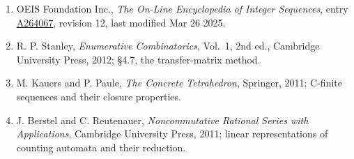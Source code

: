 \documentclass[11pt]{article}
\theoremstyle{definition}
\begin{document}
\begin{enumerate}

\item OEIS Foundation Inc., \emph{The On-Line Encyclopedia of Integer Sequences}, entry \href{https://oeis.org/A264067}{A264067}, revision 12, last modified Mar 26 2025.

\item R. P. Stanley, \emph{Enumerative Combinatorics}, Vol.~1, 2nd ed., Cambridge University Press, 2012; \S4.7, the transfer-matrix method.

\item M. Kauers and P. Paule, \emph{The Concrete Tetrahedron}, Springer, 2011; C-finite sequences and their closure properties.

\item J. Berstel and C. Reutenauer, \emph{Noncommutative Rational Series with Applications}, Cambridge University Press, 2011; linear representations of counting automata and their reduction.

\end{enumerate}
\end{document}
